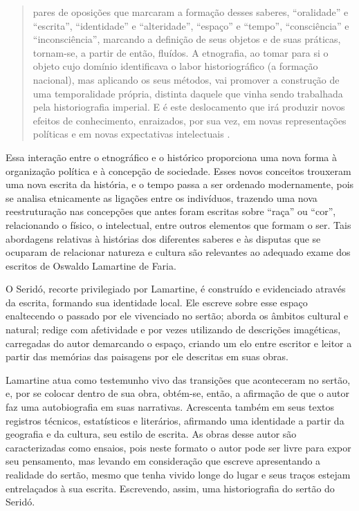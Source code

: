\begin{refsection}
    \begin{quotation}
        pares de oposições que marcaram a formação desses saberes, “oralidade” e “escrita”, “identidade” e “alteridade”, “espaço” e “tempo”, “consciência” e “inconsciência”, marcando a definição de seus objetos e de suas práticas, tornam-se, a partir de então, fluídos. A etnografia, ao tomar para si o objeto cujo domínio identificava o labor historiográfico (a formação nacional), mas aplicando os seus métodos, vai promover a construção de uma temporalidade própria, distinta daquele que vinha sendo trabalhada pela historiografia imperial. E é este deslocamento que irá produzir novos efeitos de conhecimento, enraizados, por sua vez, em novas representações políticas e em novas expectativas intelectuais \cite[p.~4]{TURIN2009história}. 
    \end{quotation}

    Essa interação entre o etnográfico e o histórico proporciona uma nova forma à organização política e à concepção de sociedade. Esses novos conceitos trouxeram uma nova escrita da história, e o tempo passa a ser ordenado modernamente, pois se analisa etnicamente as ligações entre os indivíduos, trazendo uma nova reestruturação nas concepções que antes foram escritas sobre “raça” ou “cor”, relacionando o físico, o intelectual, entre outros elementos que formam o ser. Tais abordagens relativas à histórias dos diferentes saberes e às disputas que se ocuparam de relacionar natureza e cultura são relevantes ao adequado exame dos escritos de Oswaldo Lamartine de Faria. 

    O Seridó, recorte privilegiado por Lamartine, é construído e evidenciado através da escrita, formando sua identidade local. Ele escreve sobre esse espaço enaltecendo o passado por ele vivenciado no sertão; aborda os âmbitos cultural e natural; redige com afetividade e por vezes utilizando de descrições imagéticas, carregadas do autor demarcando o espaço, criando um elo entre escritor e leitor a partir das memórias das paisagens por ele descritas em suas obras. 

    Lamartine atua como testemunho vivo das transições que aconteceram no sertão, e, por se colocar dentro de sua obra, obtém-se, então, a afirmação de que o autor faz uma autobiografia em suas narrativas. Acrescenta também em seus textos registros técnicos, estatísticos e literários, afirmando uma identidade a partir da geografia e da cultura, seu estilo de escrita. As obras desse autor são caracterizadas como ensaios, pois neste formato o autor pode ser livre para expor seu pensamento, mas levando em consideração que escreve apresentando a realidade do sertão, mesmo que tenha vivido longe do lugar e seus traços estejam entrelaçados à sua escrita. Escrevendo, assim, uma historiografia do sertão do Seridó. 


\end{refsection}
